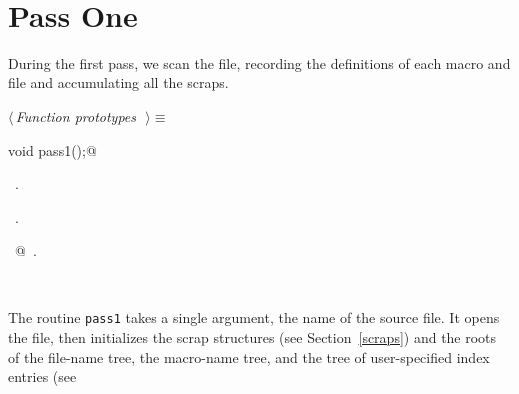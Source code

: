 \documentclass{report}
\begin{document}
\begin{flushleft}
\begin{minipage}{\linewidth}
\end{minipage}\\[4ex]
\end{flushleft}
\newpage
\section{Pass One} \label{pass-one}

During the first pass, we scan the file, recording the definitions of
each macro and file and accumulating all the scraps. 

\begin{flushleft} \small
\begin{minipage}{\linewidth} \label{scrap31}
$\langle\,${\it Function prototypes}\nobreak\ {\footnotesize {}}$\,\rangle\equiv$
\vspace{-1ex}
\begin{list}{}{} \item
\mbox{}\verb@extern void pass1();@\\
\mbox{}\verb@@{\NWsep}
\end{list}
\vspace{-1ex}
\footnotesize\addtolength{\baselineskip}{-1ex}
\begin{list}{}{\setlength{\itemsep}{-\parsep}\setlength{\itemindent}{-\leftmargin}}
\item \NWtxtMacroDefBy\ .
\item \NWtxtMacroRefIn\ .
\end{list}
\vspace{-2ex}
\footnotesize\addtolength{\baselineskip}{-1ex}
\begin{list}{}{\setlength{\itemsep}{-\parsep}\setlength{\itemindent}{-\leftmargin}}
\item \NWtxtIdentsUsed\nobreak\  @\nobreak\ .\end{list}
\end{minipage}\\[4ex]
\end{flushleft}
The routine \verb|pass1| takes a single argument, the name of the
source file. It opens the file, then initializes the scrap structures
(see Section~\ref{scraps}) and the roots of the file-name tree, the
macro-name tree, and the tree of user-specified index entries (see 
\end{document}
